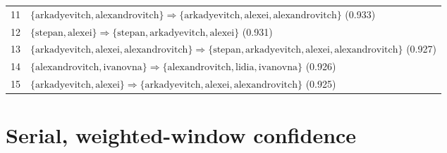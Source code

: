 \begin{appendices}
\begin{longtable}{p{20pt}|p{\dimexpr\textwidth-20pt-\tabcolsep\relax}}
11 & $ \{ \text{arkadyevitch},\allowbreak\text{alexandrovitch} \} \Rightarrow \{ \text{arkadyevitch},\allowbreak\text{alexei},\allowbreak\text{alexandrovitch} \} $ (0.933) \\
12 & $ \{ \text{stepan},\allowbreak\text{alexei} \} \Rightarrow \{ \text{stepan},\allowbreak\text{arkadyevitch},\allowbreak\text{alexei} \} $ (0.931) \\
13 & $ \{ \text{arkadyevitch},\allowbreak\text{alexei},\allowbreak\text{alexandrovitch} \} \Rightarrow \{ \text{stepan},\allowbreak\text{arkadyevitch},\allowbreak\text{alexei},\allowbreak\text{alexandrovitch} \} $ (0.927) \\
14 & $ \{ \text{alexandrovitch},\allowbreak\text{ivanovna} \} \Rightarrow \{ \text{alexandrovitch},\allowbreak\text{lidia},\allowbreak\text{ivanovna} \} $ (0.926) \\
15 & $ \{ \text{arkadyevitch},\allowbreak\text{alexei} \} \Rightarrow \{ \text{arkadyevitch},\allowbreak\text{alexei},\allowbreak\text{alexandrovitch} \} $ (0.925) \\
\end{longtable}

\section{Serial, weighted-window confidence}
\label{appendix:rules-ser-fwi}


\end{appendices}

